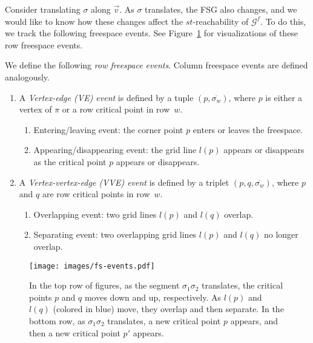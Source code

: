 \documentclass[thm-restate]{lipics-v2021}
\theoremstyle{remark}
\newcommand{\graph}[0]{\mathcal{G}}
\newcommand{\fsgraph}[0]{\graph^{f}}
\newcommand{\cseg}[1]{\overline{#1}}
\begin{document}
Consider translating $\sigma$ along $\Vec{v}$. As $\sigma$ translates, the FSG also changes, and we would like to know how these changes affect the $st$-reachability of $\fsgraph$. To do this, we track the following freespace events. See Figure~\ref{fig:fs-events} for visualizations of these row freespace events. 

\begin{definition} \label{def:fs-events}
    We define the following \emph{row freespace events}. Column freespace events are defined analogously. 
    \begin{enumerate}
        \item A \emph{Vertex-edge (VE) event} is defined by a tuple $(p, \cseg{\sigma_w})$, where $p$ is either a vertex of $\pi$ or a row critical point in row~$w$. 
        \begin{enumerate}
            \item Entering/leaving event: the corner point $p$ enters or leaves the freespace. 
            \item Appearing/disappearing event: the grid line $l(p)$ appears or disappears as the critical point $p$ appears or disappears. 
        \end{enumerate}
        \item A \emph{Vertex-vertex-edge (VVE) event} is defined by a triplet $(p, q, \cseg{\sigma_w})$, where $p$ and $q$ are row critical points in row~$w$. 
        \begin{enumerate}
            \item Overlapping event: two grid lines $l(p)$ and $l(q)$ overlap. 
            \item Separating event: two overlapping grid lines $l(p)$ and $l(q)$ no longer overlap. 
        \end{enumerate}
    \end{enumerate}

    \begin{figure}[tbh]
        \centering
        \texttt{[image: images/fs-events.pdf]}
        \caption{In the top row of figures, as the segment $\sigma_1 \sigma_2$ translates, the critical points $p$ and $q$ moves down and up, respectively. As $l(p)$ and $l(q)$ (colored in blue) move, they overlap and then separate. In the bottom row, as $\sigma_1 \sigma_2$ translates, a new critical point $p$ appears, and then a new critical point $p'$ appears. }
        \label{fig:fs-events}
    \end{figure}
\end{definition}
\end{document}
